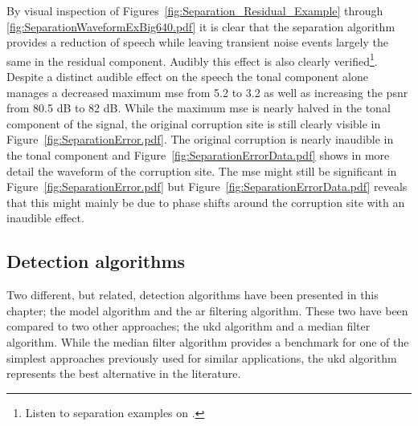 By visual inspection of Figures~\ref{fig:Separation_Residual_Example} through \ref{fig:SeparationWaveformExBig640.pdf} it is clear that the separation algorithm provides a reduction of speech while leaving transient noise events largely the same in the residual component. Audibly this effect is also clearly verified\footnote{Listen to separation examples on \siteURL.}. Despite a distinct audible effect on the speech the tonal component alone manages a decreased maximum \DIFdelbegin {}\DIFdelend \DIFaddbegin \gls{mse} \DIFaddend from 5.2 to 3.2 as well as increasing the \DIFdelbegin {}\DIFdelend \DIFaddbegin \gls{psnr} \DIFaddend from 80.5 dB to 82 dB. While the maximum \DIFdelbegin {}\DIFdelend \DIFaddbegin \gls{mse} \DIFaddend is nearly halved in the tonal component of the signal, the original corruption site is still clearly visible in Figure~\ref{fig:SeparationError.pdf}. The original corruption is nearly inaudible in the tonal component and Figure~\ref{fig:SeparationErrorData.pdf} shows in more detail the waveform of the corruption site. The \DIFdelbegin {}\DIFdelend \DIFaddbegin \gls{mse} \DIFaddend might still be significant in Figure~\ref{fig:SeparationError.pdf} but Figure~\ref{fig:SeparationErrorData.pdf} reveals that this might mainly be due to phase shifts around the corruption site with an inaudible effect.

\subsection{Detection algorithms}
Two different, but related, detection algorithms have been presented in this chapter; the \DIFdelbegin {}\DIFdelend \DIFaddbegin {}\DIFaddend model algorithm and the \DIFdelbegin {}\DIFdelend \DIFaddbegin \gls{ar} \DIFaddend filtering algorithm. These two have been compared to two other approaches; the \DIFdelbegin {}\DIFdelend \DIFaddbegin \gls{ukd} \DIFaddend algorithm \cite{Subramanya2007} and a median filter algorithm. While the median filter algorithm provides a benchmark for one of the simplest approaches previously used for similar applications, the \DIFdelbegin {}\DIFdelend \DIFaddbegin \gls{ukd} \DIFaddend algorithm represents the best alternative in the literature.

